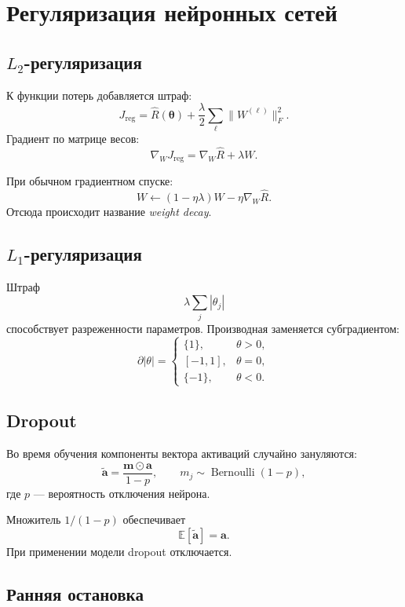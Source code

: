 \documentclass[12pt,a4paper]{article}
\theoremstyle{definition}
\newcommand{\E}{\mathbb{E}}
\newcommand{\1}{\mathbf{1}}
\begin{document}
\section{Регуляризация нейронных сетей}

\subsection{$L_2$-регуляризация}

К функции потерь добавляется штраф:
\[
    J_{\mathrm{reg}}
    =
    \widehat{R}(\bm{\theta})
    +
    \frac{\lambda}{2}\sum_{\ell}\|W^{(\ell)}\|_F^2.
\]
Градиент по матрице весов:
\[
    \nabla_WJ_{\mathrm{reg}}
    =
    \nabla_W\widehat{R}+\lambda W.
\]

При обычном градиентном спуске:
\[
    W
    \gets
    (1-\eta\lambda)W
    -
    \eta\nabla_W\widehat{R}.
\]
Отсюда происходит название \textit{weight decay}.

\subsection{$L_1$-регуляризация}

Штраф
\[
    \lambda\sum_j|\theta_j|
\]
способствует разреженности параметров. Производная заменяется
субградиентом:
\[
    \partial|\theta|
    =
    \begin{cases}
        \{1\},&\theta>0,\\
        [-1,1],&\theta=0,\\
        \{-1\},&\theta<0.
    \end{cases}
\]

\subsection{Dropout}

Во время обучения компоненты вектора активаций случайно зануляются:
\[
    \widetilde{\bm{a}}
    =
    \frac{\bm{m}\odot\bm{a}}{1-p},
    \qquad
    m_j\sim\operatorname{Bernoulli}(1-p),
\]
где $p$ --- вероятность отключения нейрона.

Множитель $1/(1-p)$ обеспечивает
\[
    \E[\widetilde{\bm{a}}]=\bm{a}.
\]
При применении модели dropout отключается.

\subsection{Ранняя остановка}
\end{document}
